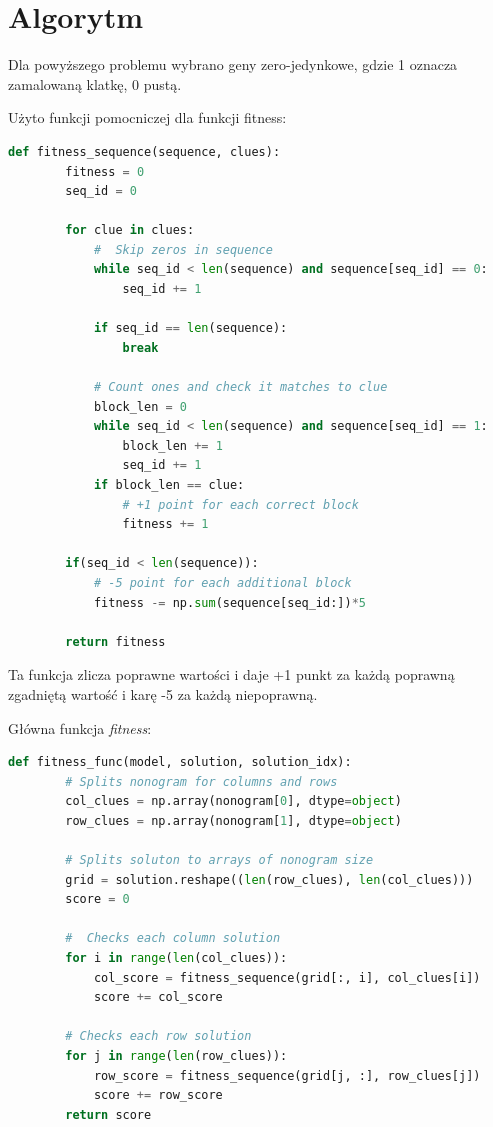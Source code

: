 \documentclass[12pt,a4paper]{article}
\begin{document}
\newpage
\section{Algorytm}

Dla powyższego problemu wybrano geny zero-jedynkowe, gdzie 1 oznacza zamalowaną klatkę, 0 pustą.

Użyto funkcji pomocniczej dla funkcji fitness:

\begin{lstlisting}[language=Python]
def fitness_sequence(sequence, clues):
        fitness = 0
        seq_id = 0
        
        for clue in clues:        
            #  Skip zeros in sequence
            while seq_id < len(sequence) and sequence[seq_id] == 0:
                seq_id += 1
                
            if seq_id == len(sequence):
                break
            
            # Count ones and check it matches to clue
            block_len = 0
            while seq_id < len(sequence) and sequence[seq_id] == 1:
                block_len += 1
                seq_id += 1   
            if block_len == clue:
                # +1 point for each correct block
                fitness += 1
        
        if(seq_id < len(sequence)):
            # -5 point for each additional block
            fitness -= np.sum(sequence[seq_id:])*5
        
        return fitness
\end{lstlisting}

Ta funkcja zlicza poprawne wartości i daje +1 punkt za każdą poprawną zgadniętą wartość i karę -5 za każdą niepoprawną.

Główna funkcja \textit{fitness}:
\begin{lstlisting}[language=Python]
 def fitness_func(model, solution, solution_idx):
        # Splits nonogram for columns and rows
        col_clues = np.array(nonogram[0], dtype=object)
        row_clues = np.array(nonogram[1], dtype=object)
        
        # Splits soluton to arrays of nonogram size
        grid = solution.reshape((len(row_clues), len(col_clues)))
        score = 0
        
        #  Checks each column solution
        for i in range(len(col_clues)):
            col_score = fitness_sequence(grid[:, i], col_clues[i])
            score += col_score
            
        # Checks each row solution
        for j in range(len(row_clues)):
            row_score = fitness_sequence(grid[j, :], row_clues[j])
            score += row_score
        return score
\end{lstlisting}
\end{document}
